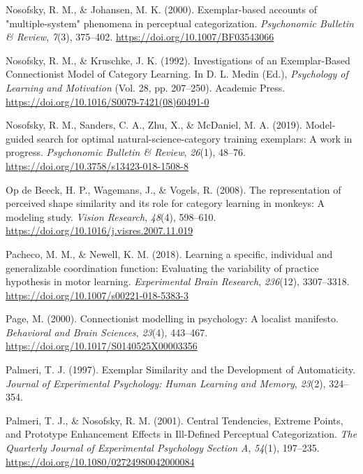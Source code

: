 \documentclass[
  11pt,
  letterpaper,
]{article}
\newlength{\cslhangindent}
\newenvironment{CSLReferences}[2] %
 {\begin{list}{}{%
  \setlength{\itemindent}{0pt}
  \setlength{\leftmargin}{0pt}
  \setlength{\parsep}{0pt}
  \ifodd #1
   \setlength{\leftmargin}{\cslhangindent}
   \setlength{\itemindent}{-1\cslhangindent}
  \fi
  \setlength{\itemsep}{#2\baselineskip}}}
 {\end{list}}
\begin{document}
\begin{CSLReferences}{1}{0}
Nosofsky, R. M., \& Johansen, M. K. (2000). Exemplar-based accounts of
"multiple-system" phenomena in perceptual categorization.
\emph{Psychonomic Bulletin \& Review}, \emph{7}(3), 375--402.
\url{https://doi.org/10.1007/BF03543066}

Nosofsky, R. M., \& Kruschke, J. K. (1992). Investigations of an
{Exemplar-Based Connectionist Model} of {Category Learning}. In D. L.
Medin (Ed.), \emph{Psychology of {Learning} and {Motivation}} (Vol. 28,
pp. 207--250). Academic Press.
\url{https://doi.org/10.1016/S0079-7421(08)60491-0}

Nosofsky, R. M., Sanders, C. A., Zhu, X., \& McDaniel, M. A. (2019).
Model-guided search for optimal natural-science-category training
exemplars: {A} work in progress. \emph{Psychonomic Bulletin \& Review},
\emph{26}(1), 48--76. \url{https://doi.org/10.3758/s13423-018-1508-8}

Op de Beeck, H. P., Wagemans, J., \& Vogels, R. (2008). The
representation of perceived shape similarity and its role for category
learning in monkeys: {A} modeling study. \emph{Vision Research},
\emph{48}(4), 598--610.
\url{https://doi.org/10.1016/j.visres.2007.11.019}

Pacheco, M. M., \& Newell, K. M. (2018). Learning a specific, individual
and generalizable coordination function: Evaluating the variability of
practice hypothesis in motor learning. \emph{Experimental Brain
Research}, \emph{236}(12), 3307--3318.
\url{https://doi.org/10.1007/s00221-018-5383-3}

Page, M. (2000). Connectionist modelling in psychology: {A} localist
manifesto. \emph{Behavioral and Brain Sciences}, \emph{23}(4), 443--467.
\url{https://doi.org/10.1017/S0140525X00003356}

Palmeri, T. J. (1997). Exemplar {Similarity} and the {Development} of
{Automaticity}. \emph{Journal of Experimental Psychology: Human Learning
and Memory}, \emph{23}(2), 324--354.

Palmeri, T. J., \& Nosofsky, R. M. (2001). Central {Tendencies},
{Extreme Points}, and {Prototype Enhancement Effects} in {Ill-Defined
Perceptual Categorization}. \emph{The Quarterly Journal of Experimental
Psychology Section A}, \emph{54}(1), 197--235.
\url{https://doi.org/10.1080/02724980042000084}


\end{CSLReferences}
\end{document}
